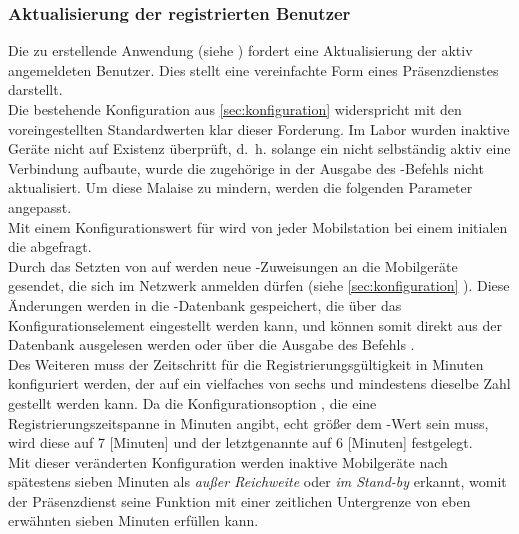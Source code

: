 \subsubsection{Aktualisierung der registrierten Benutzer}
Die zu erstellende Anwendung (siehe ) fordert eine Aktualisierung der aktiv angemeldeten Benutzer. Dies stellt eine vereinfachte Form eines Präsenzdienstes darstellt.\\
Die bestehende Konfiguration aus \autoref{sec:konfiguration} widerspricht mit den voreingestellten Standardwerten klar dieser Forderung. 
Im Labor wurden inaktive Geräte nicht auf Existenz überprüft, d.~h. solange ein \UE nicht selbständig aktiv eine Verbindung aufbaute, wurde die zugehörige \IMSI in der Ausgabe des -Befehls nicht aktualisiert. Um diese Malaise  zu mindern, werden die folgenden Parameter angepasst.\\
Mit einem Konfigurationswert  für  wird von jeder Mobilstation bei einem initialen \LUR die \IMEI abgefragt.\\
Durch das Setzten von  auf  werden neue \TMSI-Zuweisungen an die Mobilgeräte gesendet, die sich im Netzwerk anmelden dürfen (siehe \autoref{sec:konfiguration} ). Diese Änderungen werden in die \TMSI-Datenbank gespeichert, die über das Konfigurationselement  eingestellt werden kann, und können somit direkt aus der Datenbank ausgelesen werden oder über die Ausgabe des Befehls .\\
Des Weiteren muss der Zeitschritt für die Registrierungsgültigkeit in Minuten  konfiguriert werden, der auf ein vielfaches von sechs und mindestens dieselbe Zahl gestellt werden kann. Da die Konfigurationsoption , die eine Registrierungszeitspanne in Minuten angibt, echt größer dem -Wert sein muss, wird diese auf 7 [Minuten] und der letztgenannte auf 6 [Minuten] festgelegt.\\
Mit dieser veränderten Konfiguration werden inaktive Mobilgeräte nach spätestens sieben Minuten als \emph{außer Reichweite} oder \emph{im Stand-by} erkannt, womit der Präsenzdienst seine Funktion mit einer zeitlichen Untergrenze von eben erwähnten sieben Minuten erfüllen kann.
